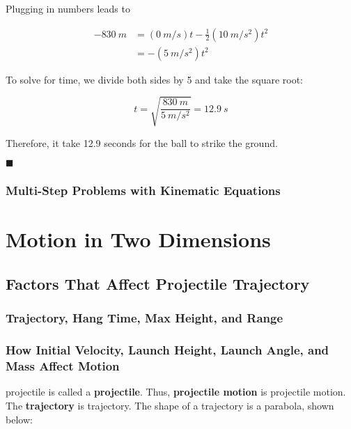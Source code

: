\documentclass[dvipsnames]{article}
\newif\ifShowUnitVII                             %
\begin{document}
Plugging in numbers leads to

\begin{align*}
    -\SI{830}{m} &= (\SI{0}{m/s}) t - \frac{1}{2}\left(\SI{10}{m/s^2}\right) t^2 \\[1ex]
    &= -\left(\SI{5}{m/s^2}\right) t^2
\end{align*}

To solve for time, we divide both sides by 5 and take the square root:

\begin{equation*}
    t = \sqrt{\frac{\SI{830}{m}}{\SI{5}{m/s^2}}} = \boxed{\SI{12.9}{s}}
\end{equation*}

Therefore, it take 12.9 seconds for the ball to strike the ground.

\hfill $\blacksquare$


\subsubsection{Multi-Step Problems with Kinematic Equations}

\fi

\clearpage

\section{Motion in Two Dimensions}

\ifShowUnitVII

\subsection{Factors That Affect Projectile Trajectory}
\subsubsection{Trajectory, Hang Time, Max Height, and Range}
\subsubsection{How Initial Velocity, Launch Height, Launch Angle, and Mass Affect Motion}


\Glsdesc{projectile} is called a \textbf{\gls{projectile}}. Thus, \textbf{\gls{projectile motion}} is \glsdesc{projectile motion}. The \textbf{\gls{trajectory}} is \glsdesc{trajectory}. The shape of a trajectory is a parabola, shown below:
\end{document}
